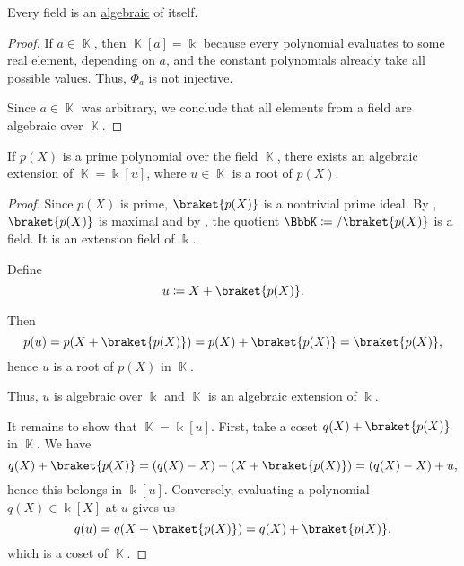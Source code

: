\begin{proposition}\label{thm:field_elements_are_algebraic}
  Every field is an \hyperref[def:algebraic_extension]{algebraic} of itself.
\end{proposition}
\begin{proof}
  If \( a \in \BbbK \), then \( \BbbK[a] = \Bbbk \) because every polynomial evaluates to some real element, depending on \( a \), and the constant polynomials already take all possible values. Thus, \( \Phi_a \) is not injective.

  Since \( a \in \BbbK \) was arbitrary, we conclude that all elements from a field are algebraic over \( \BbbK \).
\end{proof}

\begin{theorem}\label{thm:algebraic_extension_always_exists}
  If \( p(X) \) is a prime polynomial over the field \( \BbbK \), there exists an algebraic extension of \( \BbbK = \Bbbk[u] \), where \( u \in \BbbK \) is a root of \( p(X) \).
\end{theorem}
\begin{proof}
  Since \( p(X) \) is prime, \( \braket{p(X)} \) is a nontrivial prime ideal. By , \( \braket{p(X)} \) is maximal and by , the quotient \( \BbbK \coloneqq \Bbbk / \braket{p(X)} \) is a field. It is an extension field of \( \Bbbk \).

  Define
  \begin{equation*}
    u \coloneqq X + \braket{p(X)}.
  \end{equation*}

  Then
  \begin{equation*}
    p(u) = p(X + \braket{p(X)}) = p(X) + \braket{p(X)} = \braket{p(X)},
  \end{equation*}
  hence \( u \) is a root of \( p(X) \) in \( \BbbK \).

  Thus, \( u \) is algebraic over \( \Bbbk \) and \( \BbbK \) is an algebraic extension of \( \Bbbk \).

  It remains to show that \( \BbbK = \Bbbk[u] \). First, take a coset \( q(X) + \braket{p(X)} \) in \( \BbbK \). We have
  \begin{equation*}
    q(X) + \braket{p(X)} = (q(X) - X) + (X + \braket{p(X)}) = (q(X) - X) + u,
  \end{equation*}
  hence this belongs in \( \Bbbk[u] \). Conversely, evaluating a polynomial \( q(X) \in \Bbbk[X] \) at \( u \) gives us
  \begin{equation*}
    q(u) = q(X + \braket{p(X)}) = q(X) + \braket{p(X)},
  \end{equation*}
  which is a coset of \( \BbbK \).
\end{proof}


